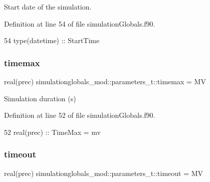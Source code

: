 Start date of the simulation. 



Definition at line 54 of file simulation\+Globals.\+f90.


\begin{DoxyCode}
54         \textcolor{keywordtype}{type}(datetime)  :: StartTime
\end{DoxyCode}
\mbox{\label{structsimulationglobals__mod_1_1parameters__t_a196b29045b2a76de4a1a0efd8c587838}} 
\subsubsection{\texorpdfstring{timemax}{timemax}}
{\footnotesize\ttfamily real(prec) simulationglobals\+\_\+mod\+::parameters\+\_\+t\+::timemax = MV\hspace{0.3cm}{\ttfamily [private]}}



Simulation duration (s) 



Definition at line 52 of file simulation\+Globals.\+f90.


\begin{DoxyCode}
52         \textcolor{keywordtype}{real(prec)}      :: TimeMax = mv              
\end{DoxyCode}
\mbox{\label{structsimulationglobals__mod_1_1parameters__t_a2be629afbb5291d0e8933c35dfb1f021}} 
\subsubsection{\texorpdfstring{timeout}{timeout}}
{\footnotesize\ttfamily real(prec) simulationglobals\+\_\+mod\+::parameters\+\_\+t\+::timeout = MV\hspace{0.3cm}{\ttfamily [private]}}



